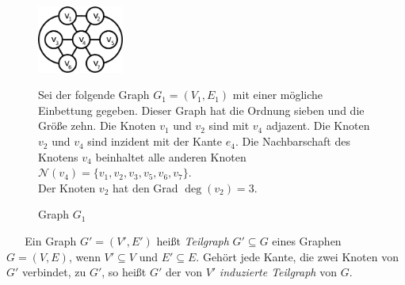\begin{figure}
\begin{minipage}{145pt}
\centering
\includegraphics*[width = 80pt]{bilder/bsp2,1.pdf}
\label{bild:bsp1}
\caption{Graph $G_1$}
\end{minipage}
\begin{minipage}{280pt}
Sei der folgende Graph $G_1=(V_1,E_1)$ mit einer mögliche Einbettung gegeben.
Dieser Graph hat die Ordnung sieben und die Größe zehn. Die Knoten $v_1$ und $v_2$ sind mit $v_4$ adjazent. Die Knoten $v_2$ und $v_4$ sind inzident mit der Kante $e_4$. Die Nachbarschaft des Knotens $v_4$ beinhaltet alle anderen Knoten $\mathcal{N}(v_4)=\{v_1,v_2,v_3,v_5,v_6,v_7\}$.\\Der Knoten $v_2$ hat den Grad $\deg(v_2)=3$. 
\end{minipage}
\end{figure}
~\linebreak
\vspace{-2mm}
~\linebreak
Ein Graph $G'=(V',E')$ heißt \emph{Teilgraph} $G'\subseteq G$ eines Graphen $G=(V,E)$, wenn $V'\subseteq V$ und $E'\subseteq E$. Gehört jede Kante, die zwei Knoten von $G'$ verbindet, zu $G'$, so heißt $G'$ der von $V'$ \emph{induzierte Teilgraph} von $G$. 
